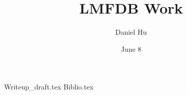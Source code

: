 \documentclass[11pt,openany,twoside=false]{scrbook}
\newcommand*{\importchapter}[2]{{#2.tex}\newpage}
\begin{document}
\title{LMFDB Work}
\author{Daniel Hu}
\date{June 8}



\setcounter{chapter}{0}

\importchapter{Writeups}{Writeup_draft}
\importchapter{Writeups}{Biblio}
\end{document}
